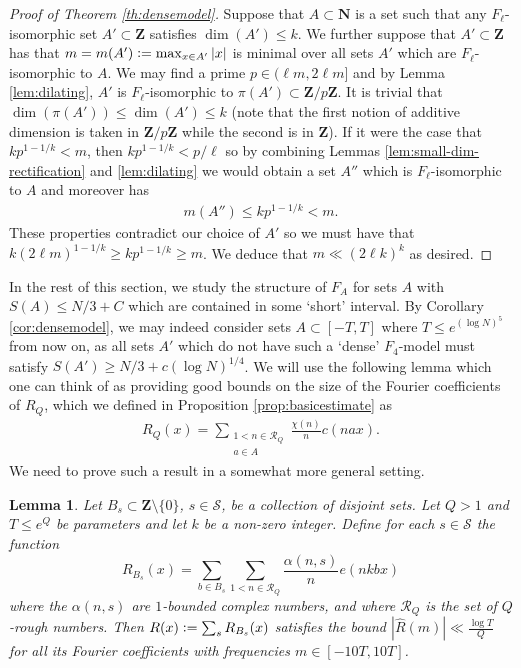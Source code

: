 \documentclass[11pt, reqno]{amsart}
\newtheorem{lemma}[theorem]{Lemma}
\begin{document}
\begin{proof}[Proof of Theorem \ref{th:densemodel}]
    Suppose that $A\subset \mathbf{N}$ is a set such that any $F_\ell$-isomorphic set $A'\subset \mathbf{Z}$ satisfies $\dim(A')\leqslant k$. We further suppose that $A'\subset \mathbf{Z}$ has that $m=m(A')\vcentcolon=\max_{x\in A'}|x|$ is minimal over all sets $A'$ which are $F_\ell$-isomorphic to $A$. We may find a prime $p\in (\ell m,2\ell m]$ and by Lemma \ref{lem:dilating}, $A'$ is $F_\ell$-isomorphic to $\pi(A')\subset\mathbf{Z}/p\mathbf{Z}$. It is trivial that $\dim(\pi(A'))\leqslant\dim(A')\leqslant k$ (note that the first notion of additive dimension is taken in $\mathbf{Z}/p\mathbf{Z}$ while the second is in $\mathbf{Z}$). If it were the case that $kp^{1-1/k}<m$, then $kp^{1-1/k}<p/\ell$ so by combining Lemmas \ref{lem:small-dim-rectification} and \ref{lem:dilating} we would obtain a set $A''$ which is $F_\ell$-isomorphic to $A$ and moreover has
    \begin{align*}
        m(A'')\leqslant kp^{1-1/k}<m.
    \end{align*}
    These properties contradict our choice of $A'$ so we must have that
    $k(2\ell m)^{1-1/k}\geqslant kp^{1-1/k}\geqslant m$. We deduce that $m\ll (2\ell k)^k$ as desired.
\end{proof}
In the rest of this section, we study the structure of $F_A$ for sets $A$ with $S(A)\leqslant N/3+C$ which are contained in some `short' interval. By Corollary \ref{cor:densemodel}, we may indeed consider sets $A\subset[-T,T]$ where $T\leqslant e^{(\log N)^5}$ from now on, as all sets $A'$ which do not have such a `dense' $F_4$-model must satisfy $S(A')\geqslant N/3+c(\log N)^{1/4}$. We will use the following lemma which one can think of as providing good bounds on the size of the Fourier coefficients of $R_Q$, which we defined in Proposition \ref{prop:basicestimate} as
\begin{align*}
        R_Q(x)=\sum_{\substack{1<n\in \mathcal{R}_Q\\ a\in A}}\frac{\chi(n)}{n}c( nax).
    \end{align*}
We need to prove such a result in a somewhat more general setting.
\begin{lemma}\label{lem:coefbound1}
    Let $B_s\subset \mathbf{Z}\setminus\{0\}$, $s\in\mathcal{S}$, be a collection of disjoint sets. Let $Q>1$ and $T\leqslant e^{Q}$ be parameters and let $k$ be a non-zero integer. Define for each $s\in\mathcal{S}$ the function
    $$R_{B_s}(x)=\sum_{b\in B_s}\sum_{1<n\in\mathcal{R}_Q}\frac{\alpha(n,s)}{n}e(nkbx)$$
    where the $\alpha(n,s)$ are $1$-bounded complex numbers, and where $\mathcal{R}_Q$ is the set of $Q$-rough numbers.
    Then
    $R(x)\vcentcolon=\sum_sR_{B_s}(x)$ satisfies the bound $|\hat{R}(m)|\ll \frac{\log T}{Q}$ for all its Fourier coefficients with frequencies $m\in[-10T,10T]$.
\end{lemma}
\end{document}
